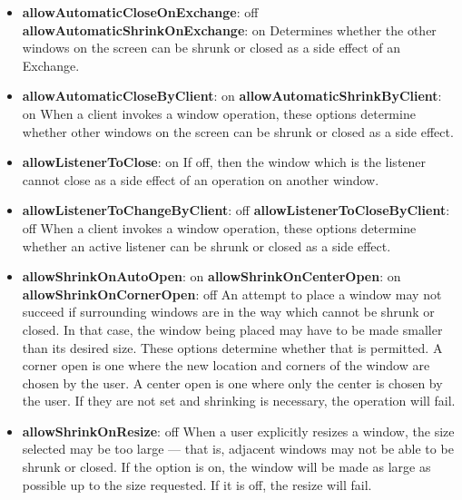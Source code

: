 \begin{itemize}
\item {\bf allowAutomaticCloseOnExchange}: off\newline{}
{\bf allowAutomaticShrinkOnExchange}: on\newline{}
Determines whether the other windows on the screen can be shrunk
or closed as a side effect of an Exchange.

\item {\bf allowAutomaticCloseByClient}: on\newline{}
{\bf allowAutomaticShrinkByClient}: on\newline{}
When a client invokes a window operation, these options determine
whether other windows on the screen can be shrunk or closed as a
side effect.

\item {\bf allowListenerToClose}: on\newline{}
If off, then the window which is the listener cannot close as
a side effect of an operation on another window.

\item {\bf allowListenerToChangeByClient}: off\newline{}
{\bf allowListenerToCloseByClient}: off\newline{}
When a client invokes a window operation, these options determine
whether an active listener can be shrunk or closed as a side effect.

\item {\bf allowShrinkOnAutoOpen}: on\newline{}
{\bf allowShrinkOnCenterOpen}: on\newline{}
{\bf allowShrinkOnCornerOpen}: off\newline{}
An attempt to place a window may not succeed if surrounding
windows are in the way which cannot be shrunk or closed.  In that
case, the window being placed may have to be made smaller than
its desired size.  These options determine whether that is
permitted.  A corner open is one where the new location and
corners of the window are chosen by the user.  A center open is
one where only the center is chosen by the user.  If they are not
set and shrinking is necessary, the operation will fail.

\item {\bf allowShrinkOnResize}: off\newline{}
When a user explicitly resizes a window, the size selected
may be too large --- that is, adjacent windows may not be able to be
shrunk or closed.
If the option is on, the window will be
made as large as possible up to the size requested.  If it is off, the
resize will fail.


\end{itemize}
